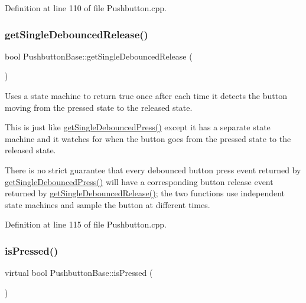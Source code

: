 Definition at line 110 of file Pushbutton.\+cpp.

\mbox{\label{class_pushbutton_base_ae568f5db0e8804247e0dcab72a311d42}} 
\subsubsection{\texorpdfstring{get\+Single\+Debounced\+Release()}{getSingleDebouncedRelease()}}
{\footnotesize\ttfamily bool Pushbutton\+Base\+::get\+Single\+Debounced\+Release (\begin{DoxyParamCaption}{ }\end{DoxyParamCaption})}



Uses a state machine to return true once after each time it detects the button moving from the pressed state to the released state. 

This is just like \hyperlink{class_pushbutton_base_a93953875c8b1c5f69dec3984774de296}{get\+Single\+Debounced\+Press()} except it has a separate state machine and it watches for when the button goes from the pressed state to the released state.

There is no strict guarantee that every debounced button press event returned by \hyperlink{class_pushbutton_base_a93953875c8b1c5f69dec3984774de296}{get\+Single\+Debounced\+Press()} will have a corresponding button release event returned by \hyperlink{class_pushbutton_base_ae568f5db0e8804247e0dcab72a311d42}{get\+Single\+Debounced\+Release()}; the two functions use independent state machines and sample the button at different times. 

Definition at line 115 of file Pushbutton.\+cpp.

\mbox{\label{class_pushbutton_base_a5b11851f15413140b75e4574e773b6ae}} 
\subsubsection{\texorpdfstring{is\+Pressed()}{isPressed()}}
{\footnotesize\ttfamily virtual bool Pushbutton\+Base\+::is\+Pressed (\begin{DoxyParamCaption}{ }\end{DoxyParamCaption})\hspace{0.3cm}{\ttfamily [pure virtual]}}




